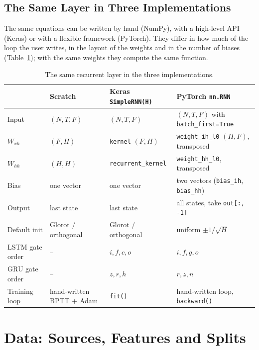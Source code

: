 \documentclass[11pt, a4paper]{article}
\begin{document}
\subsection{The Same Layer in Three Implementations}
\label{sec:three}

The same equations can be written by hand (NumPy), with a high-level API (Keras) or with a flexible framework (PyTorch). They differ in how much of the loop the user writes, in the layout of the
weights and in the number of biases (Table~\ref{tab:mapping}); with the same weights they compute the same function.

\begin{table}[H]
\centering
\caption{The same recurrent layer in the three implementations.}
\label{tab:mapping}
\small
\begin{tabularx}{\textwidth}{lXXX}
\toprule
 & Scratch & Keras \texttt{SimpleRNN(H)} & PyTorch \texttt{nn.RNN} \\
\midrule
Input & $(N,T,F)$ & $(N,T,F)$ & $(N,T,F)$ with \texttt{batch\_first=True} \\
$W_{xh}$ & $(F,H)$ & \texttt{kernel} $(F,H)$ & \texttt{weight\_ih\_l0} $(H,F)$, transposed \\
$W_{hh}$ & $(H,H)$ & \texttt{recurrent\_kernel} & \texttt{weight\_hh\_l0}, transposed \\
Bias & one vector & one vector & two vectors (\texttt{bias\_ih}, \texttt{bias\_hh}) \\
Output & last state & last state & all states, take \texttt{out[:, -1]} \\
Default init & Glorot / orthogonal & Glorot / orthogonal & uniform $\pm1/\sqrt{H}$ \\
LSTM gate order & -- & $i,f,c,o$ & $i,f,g,o$ \\
GRU gate order & -- & $z,r,h$ & $r,z,n$ \\
Training loop & hand-written BPTT + Adam & \texttt{fit()} & hand-written loop, \texttt{backward()} \\
\bottomrule
\end{tabularx}
\end{table}

\section{Data: Sources, Features and Splits}
\label{sec:data}
\end{document}
